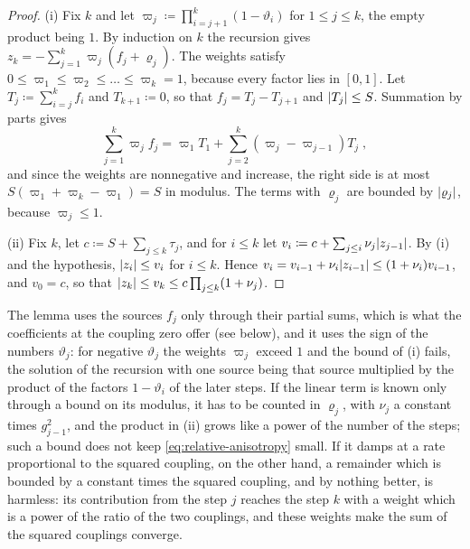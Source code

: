 \documentclass[11pt]{preprint}
\DeclarePairedDelimiter{\abs}{\lvert}{\rvert}
\numberwithin{equation}{section}
\theoremstyle{definition}
\theoremstyle{remark}
\theoremstyle{plain}
\begin{document}
\begin{proof}
(i) Fix $k$ and let $\varpi_j \coloneqq \prod_{i=j+1}^{k}(1 - \vartheta_i)$ for $1 \leq j \leq k$, the empty product being $1$. By induction on $k$ the recursion gives $z_k = -\sum_{j=1}^{k}\varpi_j(f_j + \varrho_j)$. The weights satisfy $0 \leq \varpi_1 \leq \varpi_2 \leq \dots \leq \varpi_k = 1$, because every factor lies in $[0, 1]$. Let $T_j \coloneqq \sum_{i=j}^{k}f_i$ and $T_{k+1} \coloneqq 0$, so that $f_j = T_j - T_{j+1}$ and $\abs{T_j} \leq S$. Summation by parts gives
\begin{equation}\label{eq:abel}
    \sum_{j=1}^{k}\varpi_jf_j = \varpi_1T_1 + \sum_{j=2}^{k}(\varpi_j - \varpi_{j-1})T_j\;,
\end{equation}
and since the weights are nonnegative and increase, the right side is at most $S(\varpi_1 + \varpi_k - \varpi_1) = S$ in modulus. The terms with $\varrho_j$ are bounded by $\abs{\varrho_j}$, because $\varpi_j \leq 1$.

(ii) Fix $k$, let $c \coloneqq S + \sum_{j \leq k}\tau_j$, and for $i \leq k$ let $v_i \coloneqq c + \sum_{j \leq i}\nu_j\abs{z_{j-1}}$. By (i) and the hypothesis, $\abs{z_i} \leq v_i$ for $i \leq k$. Hence $v_i = v_{i-1} + \nu_i\abs{z_{i-1}} \leq (1 + \nu_i)v_{i-1}$, and $v_0 = c$, so that $\abs{z_k} \leq v_k \leq c\prod_{j \leq k}(1 + \nu_j)$.
\end{proof}

The lemma uses the sources $f_j$ only through their partial sums, which is what the coefficients at the coupling zero offer (see below), and it uses the sign of the numbers $\vartheta_j$: for negative $\vartheta_j$ the weights $\varpi_j$ exceed $1$ and the bound of (i) fails, the solution of the recursion with one source being that source multiplied by the product of the factors $1 - \vartheta_i$ of the later steps. If the linear term is known only through a bound on its modulus, it has to be counted in $\varrho_j$, with $\nu_j$ a constant times $g_{j-1}^2$, and the product in (ii) grows like a power of the number of the steps; such a bound does not keep \eqref{eq:relative-anisotropy} small. If it damps at a rate proportional to the squared coupling, on the other hand, a remainder which is bounded by a constant times the squared coupling, and by nothing better, is harmless: its contribution from the step $j$ reaches the step $k$ with a weight which is a power of the ratio of the two couplings, and these weights make the sum of the squared couplings converge.
\end{document}
